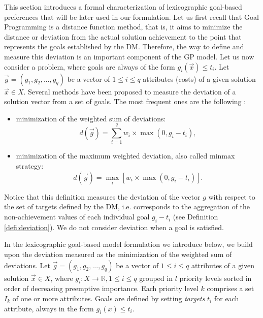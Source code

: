 This section introduces a formal characterization of lexicographic goal-based preferences that will be later used in our formulation. Let us first recall that Goal Programming is a distance function method, that is, it aims to minimize the distance or deviation from the actual solution achievement to the point that represents the goals established by the DM. Therefore, the way to define and measure this deviation is an important component of the GP model. Let us now consider a problem, where goals are always of the form $g_i(\vec x) \leq t_i$. Let $\vec g = (g_1,g_2,...,g_q)$ be a vector of $1 \leq i \leq q$ attributes (costs) of a given solution $\vec x \in X$. Several methods have been proposed to measure the deviation of a solution vector from a set of goals. The most frequent ones are the following \citep{Romero1991, Romero1993}: 

\begin{itemize}
   \item minimization of the weighted sum of deviations: 
\begin{equation}\label{eq:deviation}
   d(\vec{g}) = \sum_{i=1}^{q} w_{i} \times \max(0, g_{i} - t_{i}), 
\end{equation}
	\item minimization of the maximum weighted deviation, also called minmax strategy:
\begin{equation}\label{eq:deviation-maxmin}
   d(\vec{g}) = \max_i[w_{i} \times \max(0, g_{i} - t_{i})].
\end{equation}
\end{itemize}

Notice that this definition measures the deviation of the vector $g$ with respect to the set of targets defined by the DM, i.e. corresponds to the aggregation of the non-achievement values of each individual goal $g_{i} - t_{i}$ (see Definition \ref{defi:deviation}). We do not consider deviation when a goal is satisfied. 

In the lexicographic goal-based model formulation we introduce below, we build upon the deviation measured as the minimization of the weighted sum of deviations. Let $\vec g = (g_1,g_2,...,g_q)$ be a vector of $1 \leq i \leq q$ attributes of a given solution $\vec x \in X$, where $g_i: X \rightarrow \mathbb{R}, 1 \leq i \leq q$ grouped in $l$ priority levels sorted in order of decreasing preemptive importance. Each priority level $k$ comprises a set $I_k$ of one or more attributes. Goals are defined by setting \emph{targets} $t_i$ for each attribute, always in the form $g_{i}(x) \leq t_{i}$.

